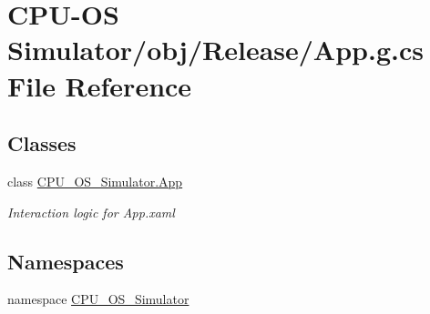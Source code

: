\hypertarget{_c_p_u-_o_s_01_simulator_2obj_2_release_2_app_8g_8cs}{}\section{C\+P\+U-\/\+O\+S Simulator/obj/\+Release/\+App.g.\+cs File Reference}
\label{_c_p_u-_o_s_01_simulator_2obj_2_release_2_app_8g_8cs}
\subsection*{Classes}
\begin{DoxyCompactItemize}
\item 
class \hyperlink{class_c_p_u___o_s___simulator_1_1_app}{C\+P\+U\+\_\+\+O\+S\+\_\+\+Simulator.\+App}
\begin{DoxyCompactList}\small\item\em Interaction logic for App.\+xaml \end{DoxyCompactList}\end{DoxyCompactItemize}
\subsection*{Namespaces}
\begin{DoxyCompactItemize}
\item 
namespace \hyperlink{namespace_c_p_u___o_s___simulator}{C\+P\+U\+\_\+\+O\+S\+\_\+\+Simulator}
\end{DoxyCompactItemize}
